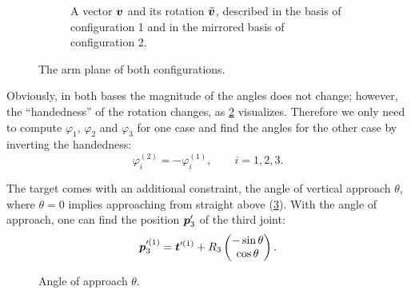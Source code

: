 \begin{figure}[tbp]
\begin{subfigure}[b]{0.4\textwidth}
    \caption{A vector $\bm{v}$ and its rotation $\tilde{\bm{v}}$,
      described in the basis of configuration 1 and in the mirrored basis
      of configuration 2.}
    \label{fig:4r-handedness}
  \end{subfigure}
  \caption{The arm plane of both configurations.}
\end{figure}

Obviously, in both bases the magnitude of the angles does not change;
however, the \enquote{handedness} of the rotation changes, as
\cref{fig:4r-handedness} visualizes. Therefore we only need to compute
$\varphi_1$, $\varphi_2$ and $\varphi_3$ for one case and find the angles
for the other case by inverting the handedness:
\begin{equation}
  \varphi_i^{(2)} = -\varphi_i^{(1)} , \qquad i = 1, 2, 3 .
  \label{eq:4r-config2}
\end{equation}

The target comes with an additional constraint, the angle of vertical
approach $\theta$, where $\theta = 0$ implies approaching from straight
above (\cref{fig:4r-approach}). With the angle of approach, one can find
the position $\bm{p}_3'$ of the third joint:
\[
  \bm{p}_3'^{(1)} = \bm{t}'^{(1)}
    + R_3 \begin{pmatrix} -\sin\theta \\ \cos\theta \end{pmatrix} .
\]

\begin{figure}[tbp]
  \centering
  \caption{Angle of approach $\theta$.}
  \label{fig:4r-approach}
\end{figure}

